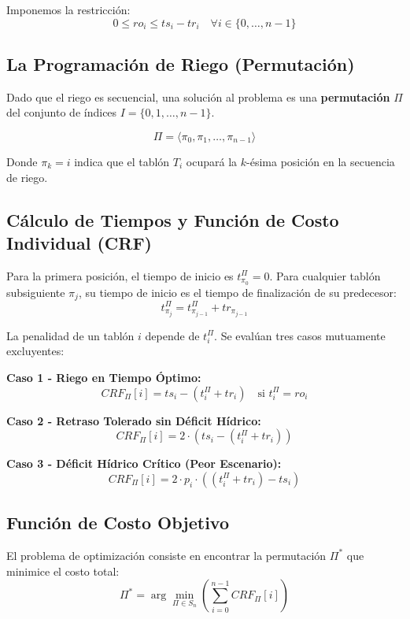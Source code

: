 \documentclass[conference, a4paper]{IEEEtran}
\begin{document}
Imponemos la restricción:
\begin{equation}
0 \leq ro_i \leq ts_i - tr_i \quad \forall i \in \{0, \dots, n-1\}
\end{equation}

\subsection{La Programación de Riego (Permutación)}
Dado que el riego es secuencial, una solución al problema es una \textbf{permutación} $\Pi$ del conjunto de índices $I = \{0, 1, \dots, n-1\}$.

\begin{equation}
\Pi = \langle \pi_0, \pi_1, \dots, \pi_{n-1} \rangle
\end{equation}

Donde $\pi_k = i$ indica que el tablón $T_i$ ocupará la $k$-ésima posición en la secuencia de riego.

\subsection{Cálculo de Tiempos y Función de Costo Individual (CRF)}
Para la primera posición, el tiempo de inicio es $t_{\pi_0}^\Pi = 0$.
Para cualquier tablón subsiguiente $\pi_j$, su tiempo de inicio es el tiempo de finalización de su predecesor:
\begin{equation}
t_{\pi_j}^\Pi = t_{\pi_{j-1}}^\Pi + tr_{\pi_{j-1}}
\end{equation}

La penalidad de un tablón $i$ depende de $t_i^\Pi$. Se evalúan tres casos mutuamente excluyentes:

\textbf{Caso 1 - Riego en Tiempo Óptimo:}
\begin{equation}
CRF_{\Pi}[i] = ts_i - (t_i^\Pi + tr_i) \quad \text{si } t_i^\Pi = ro_i
\end{equation}

\textbf{Caso 2 - Retraso Tolerado sin Déficit Hídrico:}
\begin{equation}
CRF_{\Pi}[i] = 2 \cdot \left( ts_i - (t_i^\Pi + tr_i) \right)
\end{equation}

\textbf{Caso 3 - Déficit Hídrico Crítico (Peor Escenario):}
\begin{equation}
CRF_{\Pi}[i] = 2 \cdot p_i \cdot \left( (t_i^\Pi + tr_i) - ts_i \right)
\end{equation}

\subsection{Función de Costo Objetivo}
El problema de optimización consiste en encontrar la permutación $\Pi^*$ que minimice el costo total:
\begin{equation}
\Pi^* = \arg\min_{\Pi \in S_n} \left( \sum_{i=0}^{n-1} CRF_{\Pi}[i] \right)
\end{equation}
\end{document}
